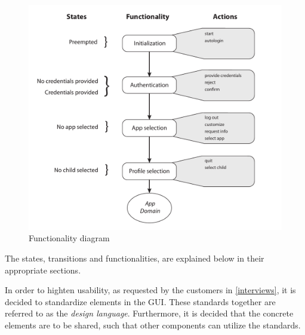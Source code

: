 \begin{figure}[h!]
	\centering
	\includegraphics[width=1\textwidth]{gfx/design_diagram.pdf}
	\caption{Functionality diagram}
	\label{fig:design_diagram}
\end{figure}

The states, transitions and functionalities, are explained below in their appropriate sections.

In order to highten usability, as requested by the customers in \autoref{interviews}, it is decided to standardize elements in the GUI. These standards together are referred to as the \emph{design language}.
Furthermore, it is decided that the concrete elements are to be shared, such that other \giraf[] components can utilize the standards.
